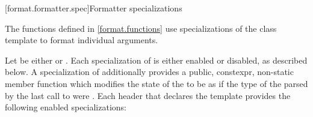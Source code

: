 \documentclass{wg21}
\begin{document}
[format.formatter.spec]{Formatter specializations}
%

\pnum
The functions defined in \ref{format.functions} use
specializations of the class template  to format
individual arguments.

\pnum
Let  be either  or .
Each specialization of  is either enabled or disabled,
as described below.
%
A  specialization of 
additionally provides
a public, constexpr, non-static member function 
which modifies the state of the  to be as if
the type of the 
parsed by the last call to  were .
Each header that declares the template 
provides the following enabled specializations:
\end{document}
